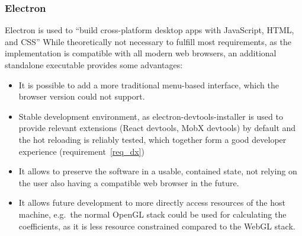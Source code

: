   \subsubsection*{Electron}
  Electron is used to ``build cross-platform desktop apps with JavaScript, HTML,
  and CSS''\cite*{noauthor_electron:_2018} While theoretically not necessary to
  fulfill most requirements, as the implementation is compatible with all modern
  web browsers, an additional standalone executable provides some advantages:
  \begin{itemize}
\item It is possible to add a more traditional menu-based interface, which the
  browser version could not support.
  \item Stable development environment, as electron-devtools-installer is used
    to provide relevant extensions (React devtools, MobX devtools) by default
    and the hot reloading is reliably tested, which together form a good
    developer experience (requirement~\ref{req_dx})
  \item It allows to preserve the software in a usable, contained state, not
    relying on the user also having a compatible web browser in the future.
\item It allows future development to more directly access resources of the host
  machine, e.g.\ the normal OpenGL stack could be used for calculating the
  coefficients, as it is less resource constrained compared to the WebGL stack.
  \end{itemize}
